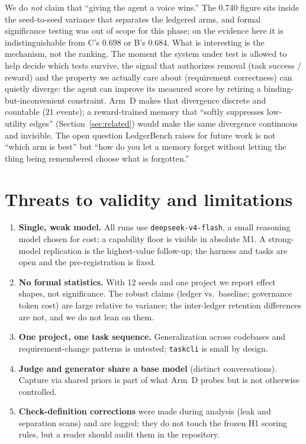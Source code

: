 \documentclass[11pt]{article}
\begin{document}
We do \emph{not} claim that ``giving the agent a voice wins.'' The 0.740
figure sits inside the seed-to-seed variance that separates the ledgered arms,
and formal significance testing was out of scope for this phase; on the
evidence here it is indistinguishable from C's 0.698 or B's 0.684. What is
interesting is the mechanism, not the ranking. The moment the system under
test is allowed to help decide which tests survive, the signal that
authorizes removal (task success / reward) and the property we actually care
about (requirement correctness) can quietly diverge: the agent can improve
its measured score by retiring a binding-but-inconvenient constraint. Arm~D
makes that divergence discrete and countable (21 events); a reward-trained
memory that ``softly suppresses low-utility edges''
(Section~\ref{sec:related}) would make the same divergence continuous and
invisible. The open question LedgerBench raises for future work is not
``which arm is best'' but ``how do you let a memory forget without letting the
thing being remembered choose what is forgotten.''

\section{Threats to validity and limitations}

\begin{enumerate}
\item \textbf{Single, weak model.} All runs use \texttt{deepseek-v4-flash}, a
small reasoning model chosen for cost; a capability floor is visible in
absolute M1. A strong-model replication is the highest-value follow-up; the
harness and tasks are open and the pre-registration is fixed.
\item \textbf{No formal statistics.} With 12 seeds and one project we report
effect shapes, not significance. The robust claims (ledger vs.\ baseline;
governance token cost) are large relative to variance; the inter-ledger
retention differences are not, and we do not lean on them.
\item \textbf{One project, one task sequence.} Generalization across codebases
and requirement-change patterns is untested; \texttt{taskcli} is small by
design.
\item \textbf{Judge and generator share a base model} (distinct
conversations). Capture via shared priors is part of what Arm~D probes but is
not otherwise controlled.
\item \textbf{Check-definition corrections} were made during analysis (leak
and separation scans) and are logged; they do not touch the frozen H1 scoring
rules, but a reader should audit them in the repository.
\end{enumerate}
\end{document}
